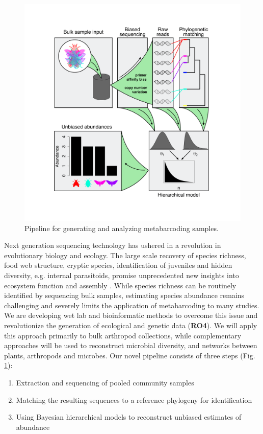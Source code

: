 \documentclass[11pt]{article}
\begin{document}
%
\begin{figure}
  \label{fig:metab}
  \vspace{-10pt}
  \begin{center}
    \includegraphics[scale=0.3]{../figs/fig_metab.pdf}
  \end{center}
  \caption{Pipeline for generating and analyzing metabarcoding
    samples.}
  \vspace{0pt}
\end{figure}
%

Next generation sequencing technology has ushered in a revolution in
evolutionary biology and ecology. The large scale recovery of species
richness, food web structure, cryptic species, identification of
juveniles and hidden diversity, e.g. internal parasitoids, promise
unprecedented new insights into ecosystem function and assembly
\citep{krehenwinkel2016, shokralla2015, gibson2014,
  taberlet2012}. While species richness can be routinely identified by
sequencing bulk samples, estimating species abundance remains
challenging \citep{elbrecht2015} and severely limits the application
of metabarcoding to many studies. We are developing wet lab and
bioinformatic methods to overcome this issue and revolutionize the
generation of ecological and genetic data ({\bf RO4}). We will apply this
approach primarily to bulk arthropod collections, while complementary
approaches will be used to reconstruct microbial diversity, and
networks between plants, arthropods and microbes. Our novel pipeline
consists of three steps (Fig. \ref{fig:metab}):
\begin{enumerate}
\item Extraction and sequencing of pooled community samples
\item Matching the resulting sequences to a reference phylogeny for
  identification
\item Using Bayesian hierarchical models to reconstruct unbiased
  estimates of abundance
\end{enumerate}
\end{document}
